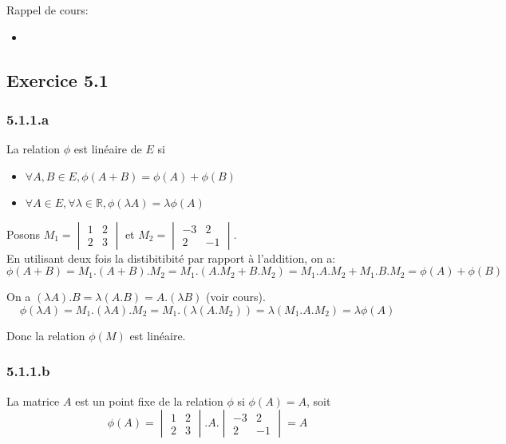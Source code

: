 \documentclass[]{book}
\theoremstyle{definition}
\newcommand{\bb}[1]{\mathbb{#1}}
\newcommand{\R}{\bb{R}}
\begin{document}
Rappel de cours: 
\begin{itemize}
\item 
\end{itemize}

 

\subsection*{Exercice 5.1}
\subsubsection*{5.1.1.a}
La relation $\phi$ est lin\'eaire de $E$ si 
\begin{itemize}
\item $\forall A, B \in E, \phi(A+B) = \phi(A) + \phi(B)$  
\item $\forall A \in E, \forall \lambda \in \R, \phi(\lambda A) = \lambda \phi(A)$
\end{itemize}

Posons $M_1=\begin{vmatrix} 1 & 2 \\ 2 & 3 \end{vmatrix}$ et $M_2 = \begin{vmatrix} -3 & 2 \\ 2 & -1 \end{vmatrix}$.\\

En utilisant deux fois la distibitibit\'e par rapport \`a l'addition, on a:
$$
\phi(A+B) = M_1.(A+B).M_2 = M_1.(A.M_2 + B.M_2) = M_1.A.M_2 + M_1.B.M_2 = \phi(A) + \phi(B)
$$

On a $(\lambda A).B = \lambda (A.B) = A. (\lambda B)$ (voir cours).
$$
\phi(\lambda A) = M_1 . (\lambda A) . M_2 = M_1 . (\lambda (A . M_2)) = \lambda (M_1.A.M_2) = \lambda \phi(A)
$$

Donc la relation $\phi(M)$ est lin\'eaire.

\subsubsection*{5.1.1.b}
La matrice $A$ est un point fixe de la relation $\phi$ si $\phi(A) = A$, soit 
$$
\phi(A) =
\begin{vmatrix} 1 & 2 \\ 2 & 3 \end{vmatrix} . A . 
\begin{vmatrix} -3 & 2 \\ 2 & -1 \end{vmatrix} = 
A
$$
\end{document}
